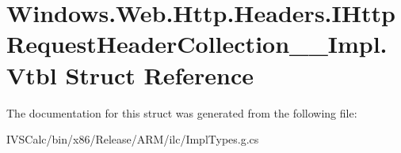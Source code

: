 \hypertarget{struct_windows_1_1_web_1_1_http_1_1_headers_1_1_i_http_request_header_collection_____impl_1_1_vtbl}{}\section{Windows.\+Web.\+Http.\+Headers.\+I\+Http\+Request\+Header\+Collection\+\_\+\+\_\+\+Impl.\+Vtbl Struct Reference}
\label{struct_windows_1_1_web_1_1_http_1_1_headers_1_1_i_http_request_header_collection_____impl_1_1_vtbl}


The documentation for this struct was generated from the following file\+:\begin{DoxyCompactItemize}
\item 
I\+V\+S\+Calc/bin/x86/\+Release/\+A\+R\+M/ilc/Impl\+Types.\+g.\+cs\end{DoxyCompactItemize}
